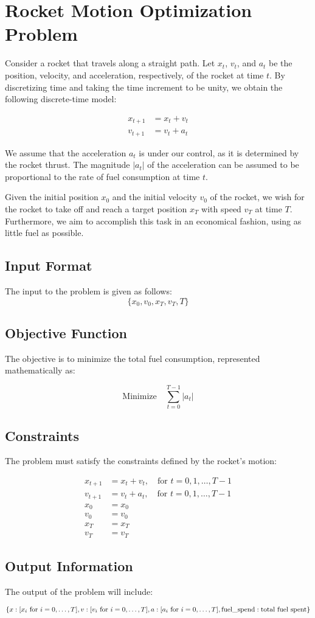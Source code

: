\documentclass{article}
\begin{document}
\section*{Rocket Motion Optimization Problem}

Consider a rocket that travels along a straight path. Let \( x_t \), \( v_t \), and \( a_t \) be the position, velocity, and acceleration, respectively, of the rocket at time \( t \). By discretizing time and taking the time increment to be unity, we obtain the following discrete-time model:

\[
\begin{align*}
x_{t+1} & = x_t + v_t \\
v_{t+1} & = v_t + a_t
\end{align*}
\]

We assume that the acceleration \( a_t \) is under our control, as it is determined by the rocket thrust. The magnitude \( |a_t| \) of the acceleration can be assumed to be proportional to the rate of fuel consumption at time \( t \).

Given the initial position \( x_0 \) and the initial velocity \( v_0 \) of the rocket, we wish for the rocket to take off and reach a target position \( x_T \) with speed \( v_T \) at time \( T \). Furthermore, we aim to accomplish this task in an economical fashion, using as little fuel as possible.

\subsection*{Input Format}
The input to the problem is given as follows:
\[
\{
    x_0, v_0, x_T, v_T, T
\}
\]

\subsection*{Objective Function}
The objective is to minimize the total fuel consumption, represented mathematically as:

\[
\text{Minimize} \quad \sum_{t=0}^{T-1} |a_t|
\]

\subsection*{Constraints}
The problem must satisfy the constraints defined by the rocket's motion:

\[
\begin{align*}
x_{t+1} & = x_t + v_t, \quad \text{for } t = 0, 1, \ldots, T-1 \\
v_{t+1} & = v_t + a_t, \quad \text{for } t = 0, 1, \ldots, T-1 \\
x_0 & = x_0 \\
v_0 & = v_0 \\
x_T & = x_T \\
v_T & = v_T
\end{align*}
\]

\subsection*{Output Information}
The output of the problem will include:

\[
\{
    x: [x_i \text{ for } i = 0, \ldots, T], \\
    v: [v_i \text{ for } i = 0, \ldots, T], \\
    a: [a_i \text{ for } i = 0, \ldots, T], \\
    \text{fuel\_spend}: \text{total fuel spent}
\}
\]
\end{document}
